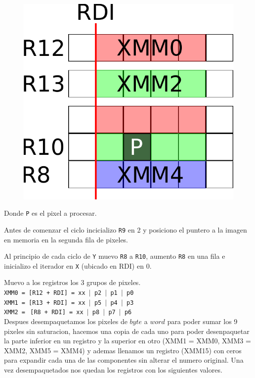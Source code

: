 \begin{figure}[h!]
	\centering
	\includegraphics[scale=0.5]{images/BlurASM1_0}
\end{figure}

Donde \texttt{P} es el pixel a procesar.

Antes de comenzar el ciclo incicializo \texttt{R9} en 2 y posiciono el puntero a la imagen en memoria en la segunda fila de pixeles.

Al principio de cada ciclo de \texttt{Y} muevo \texttt{R8} a \texttt{R10}, aumento \texttt{R8} en una fila e inicializo el iterador en \texttt{X} (ubicado en RDI) en 0.

Muevo a los registros los 3 grupos de pixeles. \\

\noindent
\texttt{XMM0 = [R12 + RDI] = xx $\vert$ p2 $\vert$ p1 $\vert$ p0}\\
\texttt{XMM1 = [R13 + RDI] = xx $\vert$ p5 $\vert$ p4 $\vert$ p3}\\
\texttt{XMM2 = $\ $[R8  + RDI] = xx $\vert$ p8 $\vert$ p7 $\vert$ p6}\\

Despues desempaquetamos los pixeles de $byte$ a $word$ para poder sumar los 9 pixeles sin saturacion, hacemos una copia de cada uno para poder desenpaquetar la parte inferior en un registro y la superior en otro (XMM1 = XMM0, XMM3 = XMM2, XMM5 = XMM4) y ademas llenamos un registro (XMM15) con ceros para expandir cada una de las componentes sin alterar el numero original.
Una vez desempaquetados nos quedan los registros con los siguientes valores.\\

